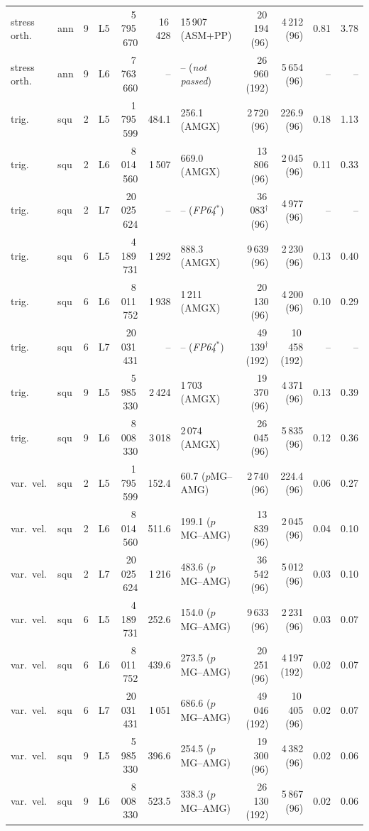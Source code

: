 \begin{tabular}{llrrrrlrrrr}
stress orth. & ann & 9 & L5 & 5\,795\,670 & 16\,428 & 15\,907 (ASM+PP) & 20\,194 (96) & 4\,212 (96) & 0.81 & 3.78\\
stress orth. & ann & 9 & L6 & 7\,763\,660 & -- & -- (\emph{not passed}) & 26\,960 (192) & 5\,654 (96) & -- & --\\
trig. & squ & 2 & L5 & 1\,795\,599 & 484.1 & 256.1 (AMGX) & 2\,720 (96) & 226.9 (96) & 0.18 & 1.13\\
trig. & squ & 2 & L6 & 8\,014\,560 & 1\,507 & 669.0 (AMGX) & 13\,806 (96) & 2\,045 (96) & 0.11 & 0.33\\
trig. & squ & 2 & L7 & 20\,025\,624 & -- & -- (\emph{FP64}$^*$) & 36\,083$^\dagger$ (96) & 4\,977 (96) & -- & --\\
trig. & squ & 6 & L5 & 4\,189\,731 & 1\,292 & 888.3 (AMGX) & 9\,639 (96) & 2\,230 (96) & 0.13 & 0.40\\
trig. & squ & 6 & L6 & 8\,011\,752 & 1\,938 & 1\,211 (AMGX) & 20\,130 (96) & 4\,200 (96) & 0.10 & 0.29\\
trig. & squ & 6 & L7 & 20\,031\,431 & -- & -- (\emph{FP64}$^*$) & 49\,139$^\dagger$ (192) & 10\,458 (192) & -- & --\\
trig. & squ & 9 & L5 & 5\,985\,330 & 2\,424 & 1\,703 (AMGX) & 19\,370 (96) & 4\,371 (96) & 0.13 & 0.39\\
trig. & squ & 9 & L6 & 8\,008\,330 & 3\,018 & 2\,074 (AMGX) & 26\,045 (96) & 5\,835 (96) & 0.12 & 0.36\\
var.\ vel. & squ & 2 & L5 & 1\,795\,599 & 152.4 & 60.7 ($p$MG--AMG) & 2\,740 (96) & 224.4 (96) & 0.06 & 0.27\\
var.\ vel. & squ & 2 & L6 & 8\,014\,560 & 511.6 & 199.1 ($p$MG--AMG) & 13\,839 (96) & 2\,045 (96) & 0.04 & 0.10\\
var.\ vel. & squ & 2 & L7 & 20\,025\,624 & 1\,216 & 483.6 ($p$MG--AMG) & 36\,542 (96) & 5\,012 (96) & 0.03 & 0.10\\
var.\ vel. & squ & 6 & L5 & 4\,189\,731 & 252.6 & 154.0 ($p$MG--AMG) & 9\,633 (96) & 2\,231 (96) & 0.03 & 0.07\\
var.\ vel. & squ & 6 & L6 & 8\,011\,752 & 439.6 & 273.5 ($p$MG--AMG) & 20\,251 (96) & 4\,197 (192) & 0.02 & 0.07\\
var.\ vel. & squ & 6 & L7 & 20\,031\,431 & 1\,051 & 686.6 ($p$MG--AMG) & 49\,046 (192) & 10\,405 (96) & 0.02 & 0.07\\
var.\ vel. & squ & 9 & L5 & 5\,985\,330 & 396.6 & 254.5 ($p$MG--AMG) & 19\,300 (96) & 4\,382 (96) & 0.02 & 0.06\\
var.\ vel. & squ & 9 & L6 & 8\,008\,330 & 523.5 & 338.3 ($p$MG--AMG) & 26\,130 (192) & 5\,867 (96) & 0.02 & 0.06\\
\bottomrule
\end{tabular}
